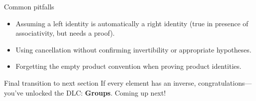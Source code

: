 \documentclass[aspectratio=169,11pt]{beamer}
\begin{document}
\begin{frame}{Common pitfalls}
\begin{itemize}
  \item Assuming a left identity is automatically a right identity (true in presence of associativity, but needs a proof).
  \item Using cancellation without confirming invertibility or appropriate hypotheses.
  \item Forgetting the empty product convention when proving product identities.
\end{itemize}
\begin{block}{Final transition to next section}
If every element has an inverse, congratulations—you’ve unlocked the DLC: \textbf{Groups}. Coming up next!
\end{block}
\end{frame}
\end{document}
